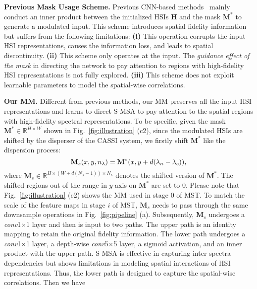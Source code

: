 \documentclass[10pt,twocolumn,letterpaper]{article}
\begin{document}
\noindent\textbf{Previous Mask Usage Scheme.}  Previous CNN-based methods~\cite{tsa_net,resu,gapnet,self} mainly conduct an inner product between the initialized HSIs $\mathbf{H}$ and the mask $\mathbf{M}^*$ to generate a modulated input. This scheme introduces spatial fidelity information but suffers from the following limitations: \textbf{(i)} This operation corrupts the input HSI representations, causes the information loss, and leads to spatial discontinuity. \textbf{(ii)} This scheme only operates at the input. The \emph{guidance effect of the mask} in directing the network to pay attention to regions with high-fidelity HSI representations is not fully explored. \textbf{(iii)} This scheme does not exploit learnable parameters to model the spatial-wise correlations.


\noindent\textbf{Our MM.}  Different from previous methods, our MM preserves all the input HSI representations and learns to direct S-MSA to pay attention to the spatial regions with high-fidelity spectral representations. To be specific, given the mask $\mathbf{M}^* \in \mathbb{R}^{H\times W}$ shown in Fig.~\ref{fig:illustration} (c2), since the modulated HSIs are shifted by the disperser of the CASSI system, we firstly shift $\mathbf{M}^*$ like the dispersion process:
\vspace{-1.6mm}
\begin{equation}
\mathbf{M}_s(x,y,n_\lambda) = \mathbf{M}^*(x,y+d(\lambda_n-\lambda_c)),
\vspace{-0.8mm}
\label{shift}
\end{equation}
where $\mathbf{M}_s\in\mathbb{R}^{H\times (W+d(N_{\lambda}-1))\times N_{\lambda}}$ denotes the shifted version of $\mathbf{M}^*$. The shifted regions out of the range in $y$-axis on $\mathbf{M}^*$ are set to 0. Please note that  Fig.~\ref{fig:illustration} (c2) shows the MM used in stage 0 of MST. To match the scale of the feature maps in stage $i$ of MST, $\mathbf{M}_s$ needs to pass through the same downsample operations in Fig.~\ref{fig:pipeline} (a). Subsequently, $\mathbf{M}_s$ undergoes a \emph{conv}1$\times$1 layer and then is input to two paths. The upper path is an identity mapping to retain the original fidelity information. The lower path undergoes a \emph{conv}1$\times$1 layer, a depth-wise  \emph{conv}5$\times$5 layer, a sigmoid activation, and an inner product with the upper path. S-MSA is effective in capturing inter-spectra dependencies but shows limitations in modeling spatial interactions of HSI representations. Thus, the lower path is designed to capture the spatial-wise correlations. Then we have
\end{document}
